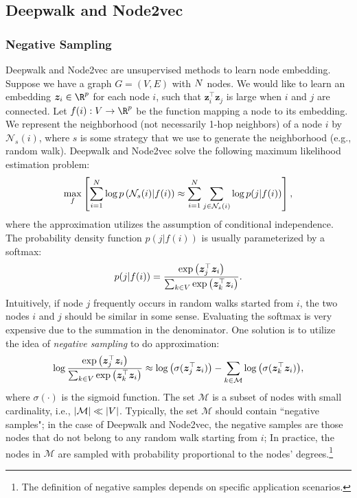     
\subsection{Deepwalk and Node2vec}
    \subsubsection{Negative Sampling}
    Deepwalk and Node2vec are unsupervised methods to learn node embedding.
    Suppose we have a graph $G=(V, E)$ with $N$ nodes.
    We would like to learn an embedding $\bm{z}_i \in \R^\nfeat$ for each node $i$, such that $\bm{z}^{\top}_i \bm{z}_j$ is large when $i$ and $j$ are connected.
    Let $f(i): V \rightarrow \R^\nfeat$ be the function mapping a node to its embedding.
    We represent the neighborhood (not necessarily 1-hop neighbors) of a node $i$ by $\mathcal{N}_{s}(i)$, where $s$ is some strategy that we use to generate the neighborhood (e.g., random walk).
    Deepwalk and Node2vec solve the following maximum likelihood estimation problem:
        \begin{equation}
            \max_{f} \left[ \sum_{i=1}^{N}{ \log p\left(\mathcal{N}_s(i) | f(i) \right)} \approx \sum_{i=1}^{N}{ \sum_{j \in \mathcal{N}_s(i)}^{}{\log p(j | f(i))} } \right],
        \end{equation}
    where the approximation utilizes the assumption of conditional independence.
    The probability density function $p(j | f(i))$ is usually parameterized by a softmax:
        \begin{equation}
            p(j | f(i)) = \frac{ \text{exp}\left( \bm{z}_j^\top \bm{z}_i \right) }{\sum_{k\in V}^{}{ \text{exp}\left( \bm{z}_k^\top \bm{z}_i \right) }}.
        \end{equation}
    Intuitively, if node $j$ frequently occurs in random walks started from $i$, the two nodes $i$ and $j$ should be similar in some sense.
    Evaluating the softmax is very expensive due to the summation in the denominator.
    One solution is to utilize the idea of \emph{negative sampling} to do approximation:
        \begin{equation}
            \log \frac{ \text{exp}\left( \bm{z}_j^\top \bm{z}_i \right) }{\sum_{k\in V}^{}{ \text{exp}\left( \bm{z}_k^\top \bm{z}_i \right) }} \approx \log\left( \sigma(\bm{z}_j^\top \bm{z}_i) \right)  - \sum_{k\in \mathcal{M}}^{}{\log\left( \sigma(\bm{z}_k^\top \bm{z}_i) \right)},
        \end{equation}
    where $\sigma(\cdot)$ is the sigmoid function.
    The set $\mathcal{M}$ is a subset of nodes with small cardinality, i.e., $| \mathcal{M} | \ll | V |$.
    Typically, the set $\mathcal{M}$ should contain ``negative samples"; in the case of Deepwalk and Node2vec, the negative samples are those nodes that do not belong to any random walk starting from $i$; In practice, the nodes in $\mathcal{M}$ are sampled with probability proportional to the nodes' degrees.\footnote{The definition of negative samples depends on specific application scenarios.}
    

